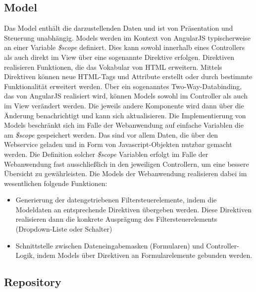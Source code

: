 \subsection{Model}

Das Model enthält die darzustellenden Daten und ist von Präsentation und Steuerung unabhängig. Models werden im Kontext von AngularJS typischerweise an einer Variable \emph{\$scope} definiert. Dies kann sowohl innerhalb eines Controllers als auch direkt im View über eine sogenannte Direktive erfolgen. Direktiven realisieren Funktionen, die das Vokabular von HTML erweitern. Mittels Direktiven können neue HTML-Tags und Attribute erstellt oder durch bestimmte Funktionalität erweitert werden. Über ein sogenanntes Two-Way-Databinding, das von AngularJS realisiert wird, können Models sowohl im Controller als auch im View verändert werden. Die jeweils andere Komponente wird dann über die Änderung benachrichtigt und kann sich aktualisieren. Die Implementierung von Models beschränkt sich im Falle der Webanwendung auf einfache Variablen die am \emph{\$scope} gespeichert werden. Das sind vor allem Daten, die über den Webservice geladen und in Form von Javascript-Objekten nutzbar gemacht werden. Die Definition solcher \emph{\$scope} Variablen erfolgt im Falle der Webanwendung fast ausschließlich in den jeweiligen Controllern, um eine bessere Übersicht zu gewährleisten. Die Models der Webanwendung realisieren dabei im wesentlichen folgende Funktionen:

\begin{itemize}
\item Generierung der datengetriebenen Filtersteuerelemente, indem die Modeldaten an entsprechende Direktiven übergeben werden. Diese Direktiven realisieren dann die konkrete Ausprägung des Filtersteuerelements (Dropdown-Liste oder Schalter)
\item Schnittstelle zwischen Dateneingabemasken (Formularen) und Controller-Logik, indem Models über Direktiven an Formularelemente gebunden werden.
\end{itemize}

\subsection{Repository}
\label{sec:imp:Respository}

